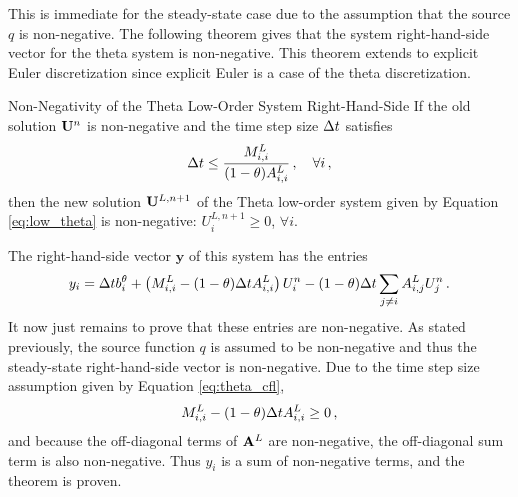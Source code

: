 
This is immediate for the steady-state case due to the assumption that the
source $q$ is non-negative. The following theorem gives that the system
right-hand-side vector for the theta system is non-negative. This theorem
extends to explicit Euler discretization since explicit Euler is a case
of the theta discretization.
\begin{thm}{Non-Negativity of the Theta Low-Order System Right-Hand-Side}
  If the old solution $\mathbf{U}^n$ is non-negative and
  the time step size $\Delta t$ satisfies
\begin{equation}\label{eq:theta_cfl}
   \Delta t \leq \frac{M^L_{i,i}}{(1-\theta)A_{i,i}^L}
    \,,\quad\forall i \,,
\end{equation}
  then the new solution $\mathbf{U}^{L,n+1}$ of the Theta low-order
  system given by Equation \eqref{eq:low_theta} is non-negative:
  $U^{L,n+1}_i \geq 0$, $\forall i$.
\end{thm}

\begin{prf}
The right-hand-side vector $\mathbf{y}$ of this system has the entries
\[
  y_i = \Delta t b^\theta_i + \left(M^L_{i,i} - (1-\theta)\Delta t A^L_{i,i}\right) U^n_i
      - (1-\theta)\Delta t\sum\limits_{j\ne i} A^L_{i,j} U^n_j
  \,.
\]
It now just remains to prove that these entries are non-negative.
As stated previously, the source function $q$ is assumed
to be non-negative and thus the steady-state right-hand-side
vector is non-negative. Due to the time step size assumption
given by Equation \eqref{eq:theta_cfl},
\[
  M^L_{i,i} - (1-\theta)\Delta t A^L_{i,i} \geq 0 \,,
\]
and because the off-diagonal terms of $\mathbf{A}^L$ are non-negative, the off-diagonal
sum term is also non-negative. Thus $y_i$ is a sum of non-negative
terms, and the theorem is proven.
\end{prf}
